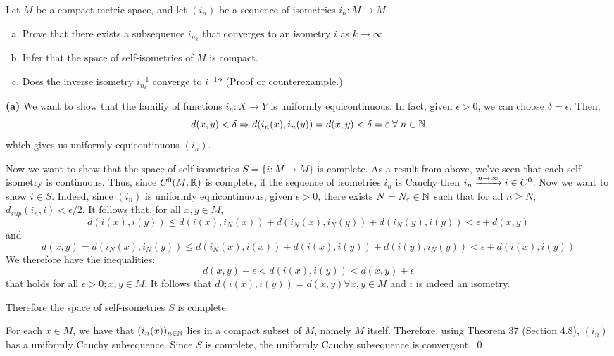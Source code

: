 \documentclass[a4paper, 12pt]{article}
\begin{document}
\begin{problem} 
Let $M$ be a compact metric space, and let $(i_n)$ be a sequence of isometries $i_n : M \to M$. \begin{enumerate} [(a)]
    \item Prove that there exists a subsequence $i_{n_k}$ that converges to an isometry $i$ as $k\to \infty$.
    \item Infer that the space of self-isometries of $M$ is compact.
    \item Does the inverse isometry $i_{n_k}^{-1}$ converge to $i^{-1}$? (Proof or counterexample.)
\end{enumerate}
\end{problem}
\begin{solution}
    \textbf{(a)} We want to show that the familiy of functions $i_n: X \to Y$ is uniformly equicontinuous. In fact, given $\epsilon > 0$, we can choose $\delta = \epsilon$. Then, \[
        d(x, y) < \delta \implies d(i_n(x), i_n(y)) = d(x, y) < \delta = \epsilon \forall n \in \bbn
    \]
    which gives us uniformly equicontinuous $(i_n)$.

    Now we want to show that the space of self-isometries $S = \{i: M \to M\}$ is complete. As a result from above, we've seen that each self-isometry is continuous. Thus, since $C^0(M, \mathbb{R})$ is complete, if the sequence of isometries $i_n$ is Cauchy then $i_n \xrightarrow{n \to \infty} i \in C^0$. Now we want to show $i \in S$. Indeed, since $(i_n)$ is uniformly equicontinuous, given $\epsilon > 0$, there exists $N = N_\varepsilon \in \mathbb{N}$ such that for all $n \geq N$, $d_{sup}(i_n, i) < \epsilon / 2$. It follows that, for all $x, y \in M$,
    \[
        d(i(x), i(y)) \leq d(i(x), i_N(x)) + d(i_N(x), i_N(y)) + d(i_N(y), i(y)) < \epsilon + d(x, y)
    \]
    and \[
        d(x, y) = d(i_N(x), i_N(y)) \leq d(i_N(x), i(x)) + d(i(x), i(y)) + d(i(y), i_N(y)) < \epsilon + d(i(x),i(y))
    \]
    We therefore have the inequalities:
    \[
        d(x, y) - \epsilon < d(i(x), i(y)) < d(x, y) + \epsilon
    \]
    that holds for all $\epsilon > 0; x, y \in M$. It follows that $d(i(x), i(y)) = d(x, y) \forall x, y \in M$ and $i$ is indeed an isometry.

    Therefore the space of self-isometries $S$ is complete.


    For each $x \in M$, we have that $(i_n(x))_{n \in \mathbb{N}}$ lies in a compact subset of $M$, namely $M$ itself. Therefore, using Theorem 37 (Section 4.8), $(i_n)$ has a uniformly Cauchy subsequence. Since $S$ is complete, the uniformly Cauchy subsequence is convergent. \qed


\end{solution}
\end{document}
